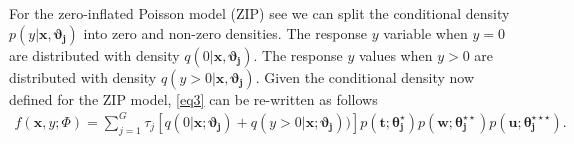 \documentclass[11pt,letterpaper]{article}
\numberwithin{equation}{section}
\numberwithin{equation}{section}
\numberwithin{equation}{section}
\begin{document}
For the zero-inflated Poisson model (ZIP) see \cite{Lambert} we can split the conditional density $p(y|\bm{x},\bm{\vartheta_j})$ into zero and non-zero densities. %
The response $y$ variable when $y= 0$  are distributed with density $q(0|\bm{x},\bm{\vartheta_{j}})$. The response $y$ values when $y > 0$ are distributed with density $q(y > 0|\bm{x}, \bm{\vartheta_{j}} )$. Given the conditional density now defined for the ZIP model, \eqref{eq3}   
can be re-written as follows 
 \begin{align}
 f(\bm x, y; \Phi)= \sum_{j=1}^{G} \tau_j \left[ q(0|\bm{x};\bm{\vartheta_{j} }) +  q(y > 0|\bm{x} ; \bm{\vartheta_{j}})  ) \right]   p(\bm{t};\bm{\theta_j^{\star}})p(\bm{w};\bm{\theta_j^{\star\star}})p(\bm{u};\bm{\theta_j^{\star\star\star}}). 
\end{align}
\end{document}
